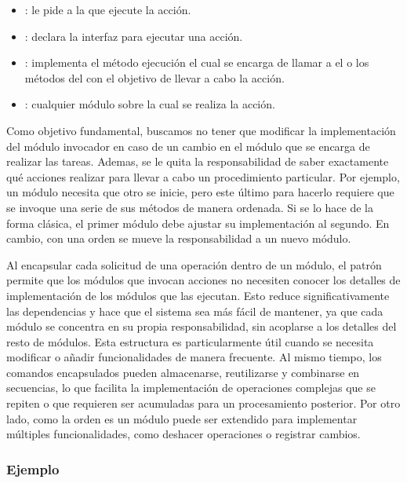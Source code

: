 \begin{itemize}
    \item \Invocador: le pide a la \Orden que ejecute la acción.
    \item \Orden: declara la interfaz para ejecutar una acción.
    \item \OrdenConcreta: implementa el método ejecución el cual se encarga de llamar a el o los métodos del \Receptor con el objetivo de llevar a cabo la acción.
    \item \Receptor: cualquier módulo sobre la cual se realiza la acción.
\end{itemize}

Como objetivo fundamental, buscamos no tener que modificar la implementación del módulo invocador en caso de un cambio en el módulo que se encarga de realizar las tareas. Ademas, se le quita la responsabilidad de saber exactamente qué acciones realizar para llevar a cabo un procedimiento particular. Por ejemplo, un módulo necesita que otro se inicie, pero este último para hacerlo requiere que se invoque una serie de sus métodos de manera ordenada. Si se lo hace de la forma clásica, el primer módulo debe ajustar su implementación al segundo. En cambio, con una orden se mueve la responsabilidad a un nuevo módulo.

Al encapsular cada solicitud de una operación dentro de un módulo, el patrón permite que los módulos que invocan acciones no necesiten conocer los detalles de implementación de los módulos que las ejecutan. Esto reduce significativamente las dependencias y hace que el sistema sea más fácil de mantener, ya que cada módulo se concentra en su propia responsabilidad, sin acoplarse a los detalles del resto de módulos. Esta estructura es particularmente útil cuando se necesita modificar o añadir funcionalidades de manera frecuente. Al mismo tiempo, los comandos encapsulados pueden almacenarse, reutilizarse y combinarse en secuencias, lo que facilita la implementación de operaciones complejas que se repiten o que requieren ser acumuladas para un procesamiento posterior. Por otro lado, como la orden es un módulo puede ser extendido para implementar múltiples funcionalidades, como deshacer operaciones o registrar cambios. 

\subsubsection{Ejemplo}


